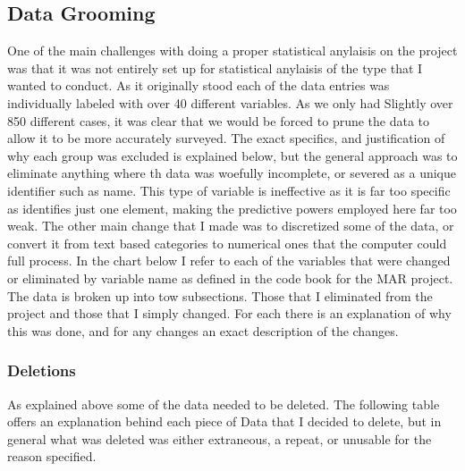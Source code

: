 \documentclass[12pt]{article}
\begin{document}
\subsection{Data Grooming}
One of the main challenges with doing a proper statistical anylaisis on the project was that it was not entirely set up for statistical anylaisis of the type that I wanted to conduct. As it originally stood each of the data entries was individually labeled with over 40 different variables. As we only had Slightly over 850 different cases, it was clear that we would be forced to prune the data to allow it to be more accurately surveyed. The exact specifics, and justification of why each group was excluded is explained below, but the general approach was to eliminate anything where th data was woefully incomplete, or severed as a unique identifier such as name. This type of variable is ineffective as it is far too specific as identifies just one element, making the predictive powers employed here far too weak. The other main change that I made was to discretized some of the data, or convert it from text based categories to numerical ones that the computer could full process. In the chart below I refer to each of the variables that were changed or eliminated by variable name as defined in the code book for the MAR project. The data is broken up into tow subsections. Those that I eliminated from the project and those that I simply changed. For each there is an explanation of why this was done, and for any changes an exact description of the changes. \\

\subsubsection{Deletions}
As explained above some of the data needed to be deleted. The following table offers an explanation behind each piece of Data that I decided to delete, but in general what was deleted was either extraneous, a repeat, or unusable for the reason specified. \\

\vspace{5mm}
\end{document}
